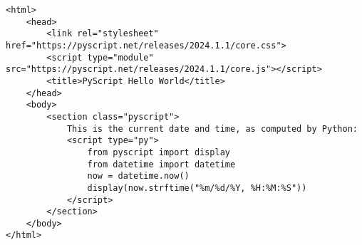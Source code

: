 \begin{verbatim}
<html>
    <head>
        <link rel="stylesheet" href="https://pyscript.net/releases/2024.1.1/core.css">
        <script type="module" src="https://pyscript.net/releases/2024.1.1/core.js"></script>
        <title>PyScript Hello World</title>
    </head>
    <body>
        <section class="pyscript">
            This is the current date and time, as computed by Python:
            <script type="py">
                from pyscript import display
                from datetime import datetime
                now = datetime.now()
                display(now.strftime("%m/%d/%Y, %H:%M:%S"))
            </script>
        </section>
    </body>
</html>
\end{verbatim}
